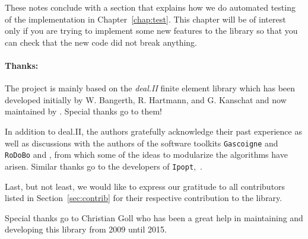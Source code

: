 These notes conclude with a section that explains how we do automated testing of the 
implementation in Chapter~\ref{chap:test}. This chapter will be of interest only if you 
are trying to implement some new features to the library so that you can check that 
the new code did not break anything.

\paragraph{Thanks:}
The \dope{} project is 
mainly based on the \textit{deal.II} finite element library which has been developed
 initially by W. Bangerth, R. Hartmann, and G. Kanschat \cite{deal} and 
now maintained by \cite{deal2}. Special thanks go to them!

In addition to deal.II, the authors 
gratefully acknowledge their past experience as well as discussions with 
the authors of  
the software toolkits \texttt{Gascoigne} and \texttt{RoDoBo}
\cite{Gascoigne} and \cite{rodobo-web}, 
from which some of the ideas to modularize the algorithms have arisen.
Similar thanks go to the developers of \texttt{Ipopt},~\cite{ipopt}.

Last, but not least, we would like to express our gratitude 
to all contributors listed in Section~\ref{sec:contrib}
for their respective contribution to the library.

Special thanks go to Christian Goll who has been a great help in 
maintaining and developing this library from 2009 until 2015. 
 

%
%
%
%






